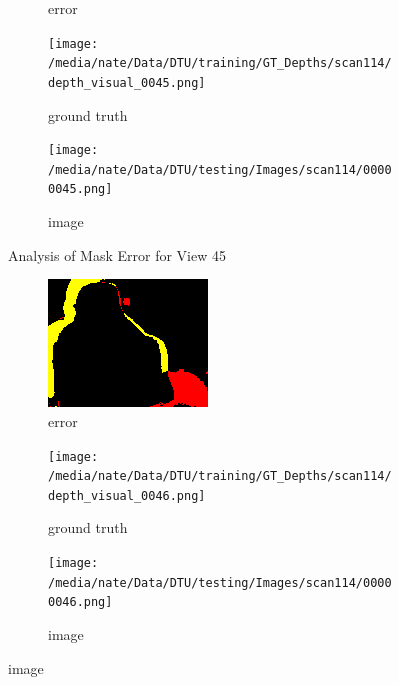 \documentclass{article}
\begin{document}
\begin{figure}
\begin{subfigure}{0.3\textwidth}
		\caption{error}
		\label{fig:error45}
	\end{subfigure}
	\hfill
	\centering
	\begin{subfigure}{0.3\textwidth}
		\centering
		\texttt{[image: /media/nate/Data/DTU/training/GT\_Depths/scan114/depth\_visual\_0045.png]}
		\caption{ground truth}
		\label{fig:gt45}
	\end{subfigure}
	\hfill
	\centering
	\begin{subfigure}{0.3\textwidth}
		\centering
		\texttt{[image: /media/nate/Data/DTU/testing/Images/scan114/00000045.png]}
		\caption{image}
		\label{fig:img45}
	\end{subfigure}
	\hfill
	\caption{Analysis of Mask Error for View 45}
	\label{fig:error_analys45}
\end{figure}\begin{figure}
	\centering
	\begin{subfigure}{0.3\textwidth}
		\centering
		\includegraphics[width=\textwidth]{./output/046_error.png}
		\caption{error}
		\label{fig:error46}
	\end{subfigure}
	\hfill
	\centering
	\begin{subfigure}{0.3\textwidth}
		\centering
		\texttt{[image: /media/nate/Data/DTU/training/GT\_Depths/scan114/depth\_visual\_0046.png]}
		\caption{ground truth}
		\label{fig:gt46}
	\end{subfigure}
	\hfill
	\centering
	\begin{subfigure}{0.3\textwidth}
		\centering
		\texttt{[image: /media/nate/Data/DTU/testing/Images/scan114/00000046.png]}
		\caption{image}

\end{subfigure}
\end{figure}
\end{document}
